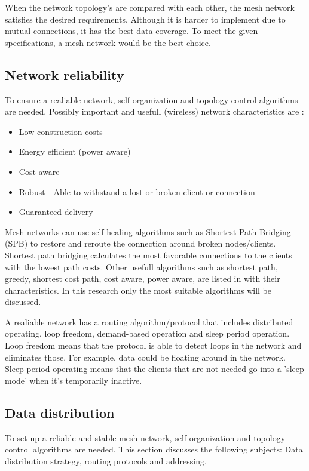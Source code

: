 \documentclass[10pt,a4paper]{article}
\begin{document}
When the network topology's are compared with each other, the mesh network satisfies the desired requirements. Although it is harder to implement due to mutual connections, it has the best data coverage. To meet the given specifications, a mesh network would be the best choice.

\newpage
\subsection{Network reliability}
To ensure a realiable network, self-organization and topology control algorithms are needed.\cite{WMN1} Possibly important and usefull (wireless) network characteristics are \cite{position-based}:
\begin{itemize}
\setlength\itemsep{0em}
    \item Low construction costs
    \item Energy efficient (power aware)
    \item Cost aware
    \item Robust - Able to withstand a lost or broken client or connection
    \item Guaranteed delivery
\end{itemize}

Mesh networks can use self-healing algorithms such as Shortest Path Bridging (SPB) to restore and reroute the connection around broken nodes/clients. Shortest path bridging calculates the most favorable connections to the clients with the lowest path costs. \cite{SPB} Other usefull algorithms such as shortest path, greedy, shortest cost path, cost aware, power aware, are listed in \cite{position-based} with their characteristics. In this research only the most suitable algorithms will be discussed. 

A realiable network has a routing algorithm/protocol that includes distributed operating, loop freedom, demand-based operation and sleep period operation. Loop freedom means that the protocol is able to detect loops in the network and eliminates those. For example, data could be floating around in the network. Sleep period operating means that the clients that are not needed go into a 'sleep mode' when it's temporarily inactive.\cite{position-based}

\newpage
\subsection{Data distribution}
To set-up a reliable and stable mesh network, self-organization and topology control algorithms are needed. \cite{WMN1}\cite{position-based} This section discusses the following subjects: Data distribution strategy, routing protocols and addressing.\\
\end{document}
